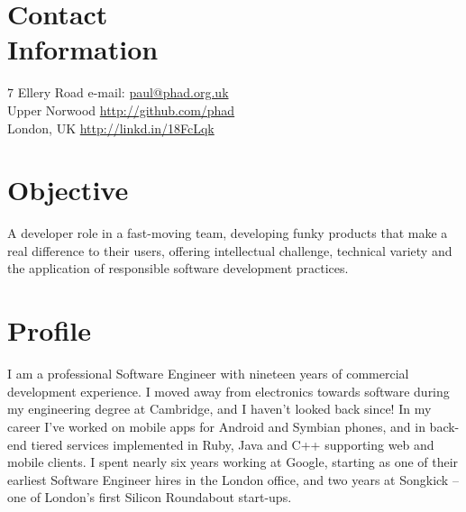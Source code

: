 \documentclass[margin = 0cm,line]{resume}
\begin{document}
\begin{resume}

    \section{\mysidestyle Contact\\Information}

    7 Ellery Road                          \hfill e-mail: \url{paul@phad.org.uk}            \vspace{0mm}\\\vspace{0mm}%
    Upper Norwood                          \hfill \url{http://github.com/phad}              \vspace{0mm}\\\vspace{0mm}%
    London, UK                             \hfill \url{http://linkd.in/18FcLqk}          \vspace{0mm}\\\vspace{-4.5mm}%

    \section{\mysidestyle Objective}

    A developer role in a fast-moving team, developing funky products that make a real difference to their users,
    offering intellectual challenge, technical variety and the application of responsible software development
    practices.

    \section{\mysidestyle Profile}

    I am a professional Software Engineer with nineteen years of commercial development experience.  I moved away from
    electronics towards software during my engineering degree at Cambridge, and I haven't looked back since!  In my
    career I've worked on mobile apps for Android and Symbian phones, and in back-end tiered services implemented in
    Ruby, Java and C++ supporting web and mobile clients.  I spent nearly six years working at Google, starting as one
    of their earliest Software Engineer hires in the London office, and two years at Songkick -- one of London's first
    Silicon Roundabout start-ups. 


\end{resume}
\end{document}
